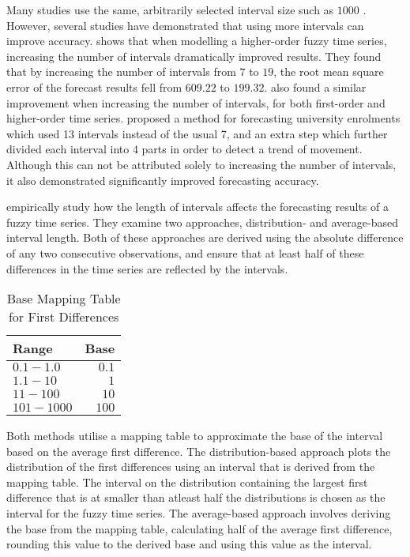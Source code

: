 \documentclass{article}
\theoremstyle{definition}
\begin{document}
Many studies use the same, arbitrarily selected interval size such as $1000$ \citep{song1993forecasting, song1994forecasting, chen1996forecasting, tsai2000forecasting, chen2004new}. However, several studies have demonstrated that using more intervals can improve accuracy. \citep{tsai2000forecasting} shows that when modelling a higher-order fuzzy time series, increasing the number of intervals dramatically improved results. They found that by increasing the number of intervals from $7$ to $19$, the root mean square error of the forecast results fell from $609.22$ to $199.32$. \cite{tsai1999study} also found a similar improvement when increasing the number of intervals, for both first-order and higher-order time series. \cite{chen2004new} proposed a method for forecasting university enrolments which used 13 intervals instead of the usual 7, and an extra step which further divided each interval into 4 parts in order to detect a trend of movement. Although this can not be attributed solely to increasing the number of intervals, it also demonstrated significantly improved forecasting accuracy. 	

\cite{Huarng2001effective} empirically study how the length of intervals affects the forecasting results of a fuzzy time series. They examine two approaches, distribution- and average-based interval length. Both of these approaches are derived using the absolute difference of any two consecutive observations, and ensure that at least half of these differences in the time series are reflected by the intervals. 

\begin{table}[H]
	\center
	\begin{tabularx}{0.5\textwidth}{ X R }
  	Range & Base \\
  	\hline 
  	\noalign{\smallskip}
  	$0.1-1.0$ & $0.1$ \\
  	$1.1-10$ & $1$ \\
  	$11-100$ & $10$ \\
  	$101-1000$ & $100$ \\
	\end{tabularx}
	\caption{Base Mapping Table for First Differences}
\end{table}

Both methods utilise a mapping table to approximate the base of the interval based on the average first difference. The distribution-based approach plots the distribution of the first differences using an interval that is derived from the mapping table. The interval on the distribution containing the largest first difference that is at smaller than atleast half the distributions is chosen as the interval for the fuzzy time series. The average-based approach involves deriving the base from the mapping table, calculating half of the average first difference, rounding this value to the derived base and using this value as the interval.
\end{document}
